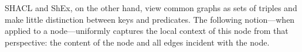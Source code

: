 SHACL and ShEx, on the other hand, view common graphs as sets of triples and
make little distinction between keys and predicates.
The following notion---when applied to a node---uniformly captures the local
context of this node from that perspective: the content of the node and all
edges incident with the node.






